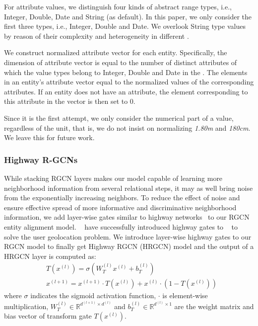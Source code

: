 	For attribute values, we distinguish four kinds of abstract range types, i.e., Integer, Double, Date and String (as default).
	In this paper, we only consider the first three types, i.e., Integer, Double and Date.
	We overlook String type values by reason of their complexity and heterogeneity in different \KGs.
	
	We construct normalized attribute vector for each entity.
	Specifically, the dimension of attribute vector is equal to the number of distinct attributes of which the value types belong to Integer, Double and Date in the \KG.
	The elements in an entity’s attribute vector equal to the normalized values of the corresponding attributes.
	If an entity does not have an attribute, the element corresponding to this attribute in the vector is then set to 0.
	
	Since it is the first attempt, we only consider the numerical part of a value, regardless of the unit, that is, we do not insist on normalizing \emph{1.80m} and \emph{180cm}.
	We leave this for future work.


	\subsubsection{Highway R-GCNs}
	\label{section:hgcn}
	While stacking RGCN layers makes our model capable of learning more neighborhood information from several relational steps, it may as well bring noise from the exponentially increasing neighbors. To reduce the effect of noise and ensure effective spread of more informative and discriminative neighborhood information, we add layer-wise gates similar to highway networks~\cite{Srivastava2015Highway} to our RGCN entity alignment model. ~\cite{Rahimi2018Semi} have successfully introduced highway gates to \GCNs~\cite{Kipf2016Semi} to solve the user geolocation problem. We introduce layer-wise highway gates to our RGCN model to finally get Highway RGCN (HRGCN) model and the output of a HRGCN layer is computed as:
	\begin{equation}
	\begin{split}
	&T(x^{(l)})=\sigma(W_T^{(l)}x^{(l)}+b_T^{(l)}) \\
	&x^{(l+1)}=x^{(l+1)} \cdot T(x^{(l)})+x^{(l)} \cdot (1-T(x^{(l)}))
	\end{split}
	\end{equation}
	where $\sigma$ indicates the sigmoid activation function, $\cdot$ is element-wise multiplication, $W_T^{(l)} \in \mathbb{R}^{d^{(l+1)} \times d^{(l)}}$ and $b_T^{(l)} \in \mathbb{R}^{d^{(l)} \times 1}$ are the weight matrix and bias vector of transform gate $T(x^{(l)})$.
	
